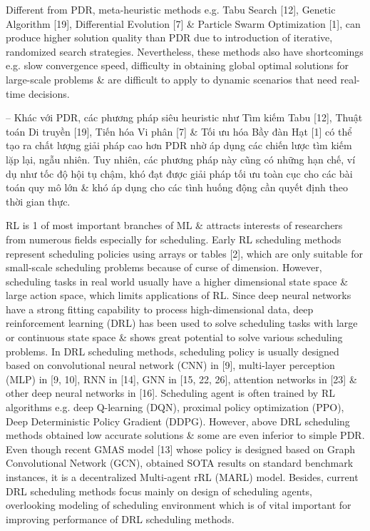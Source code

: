 \documentclass{article}
\begin{document}
\begin{itemize}
    Different from PDR, meta-heuristic methods e.g. Tabu Search [12], Genetic Algorithm [19], Differential Evolution [7] \& Particle Swarm Optimization [1], can produce higher solution quality than PDR due to introduction of iterative, randomized search strategies. Nevertheless, these methods also have shortcomings e.g. slow convergence speed, difficulty in obtaining global optimal solutions for large-scale problems \& are difficult to apply to dynamic scenarios that need real-time decisions.

    -- Khác với PDR, các phương pháp siêu heuristic như Tìm kiếm Tabu [12], Thuật toán Di truyền [19], Tiến hóa Vi phân [7] \& Tối ưu hóa Bầy đàn Hạt [1] có thể tạo ra chất lượng giải pháp cao hơn PDR nhờ áp dụng các chiến lược tìm kiếm lặp lại, ngẫu nhiên. Tuy nhiên, các phương pháp này cũng có những hạn chế, ví dụ như tốc độ hội tụ chậm, khó đạt được giải pháp tối ưu toàn cục cho các bài toán quy mô lớn \& khó áp dụng cho các tình huống động cần quyết định theo thời gian thực.

    RL is 1 of most important branches of ML \& attracts interests of researchers from numerous fields especially for scheduling. Early RL scheduling methods represent scheduling policies using arrays or tables [2], which are only suitable for small-scale scheduling problems because of curse of dimension. However, scheduling tasks in real world usually have a higher dimensional state space \& large action space, which limits applications of RL. Since deep neural networks have a strong fitting capability to process high-dimensional data, deep reinforcement learning (DRL) has been used to solve scheduling tasks with large or continuous state space \& shows great potential to solve various scheduling problems. In DRL scheduling methods, scheduling policy is usually designed based on convolutional neural network (CNN) in [9], multi-layer perception (MLP) in [9, 10], RNN in [14], GNN in [15, 22, 26], attention networks in [23] \& other deep neural networks in [16]. Scheduling agent is often trained by RL algorithms e.g. deep Q-learning (DQN), proximal policy optimization (PPO), Deep Deterministic Policy Gradient (DDPG). However, above DRL scheduling methods obtained low accurate solutions \& some are even inferior to simple PDR. Even though recent GMAS model [13] whose policy is designed based on Graph Convolutional Network (GCN), obtained SOTA results on standard benchmark instances, it is a decentralized Multi-agent rRL (MARL) model. Besides, current DRL scheduling methods focus mainly on design of scheduling agents, overlooking modeling of scheduling environment which is of vital important for improving performance of DRL scheduling methods.


\end{itemize}
\end{document}
